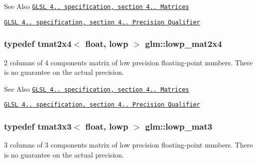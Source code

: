 \begin{DoxySeeAlso}{See Also}
\href{http://www.opengl.org/registry/doc/GLSLangSpec.4.20.8.pdf}{\tt G\-L\-S\-L 4.. specification, section 4.. Matrices} 

\href{http://www.opengl.org/registry/doc/GLSLangSpec.4.20.8.pdf}{\tt G\-L\-S\-L 4.. specification, section 4.. Precision Qualifier} 
\end{DoxySeeAlso}
\hypertarget{group__core__precision_gafb9e8f974dd69b38b5acc16989882aa0}{
\subsubsection[{lowp\-\_\-mat2x4}]{\setlength{\rightskip}{0pt plus 5cm}typedef tmat2x4$<$ float, lowp $>$ {\bf glm\-::lowp\-\_\-mat2x4}}}\label{group__core__precision_gafb9e8f974dd69b38b5acc16989882aa0}
2 columns of 4 components matrix of low precision floating-\/point numbers. There is no guarantee on the actual precision.

\begin{DoxySeeAlso}{See Also}
\href{http://www.opengl.org/registry/doc/GLSLangSpec.4.20.8.pdf}{\tt G\-L\-S\-L 4.. specification, section 4.. Matrices} 

\href{http://www.opengl.org/registry/doc/GLSLangSpec.4.20.8.pdf}{\tt G\-L\-S\-L 4.. specification, section 4.. Precision Qualifier} 
\end{DoxySeeAlso}
\hypertarget{group__core__precision_ga35fabe40e121bf764419b1d355cbbcd2}{
\subsubsection[{lowp\-\_\-mat3}]{\setlength{\rightskip}{0pt plus 5cm}typedef tmat3x3$<$ float, lowp $>$ {\bf glm\-::lowp\-\_\-mat3}}}\label{group__core__precision_ga35fabe40e121bf764419b1d355cbbcd2}
3 columns of 3 components matrix of low precision floating-\/point numbers. There is no guarantee on the actual precision.


